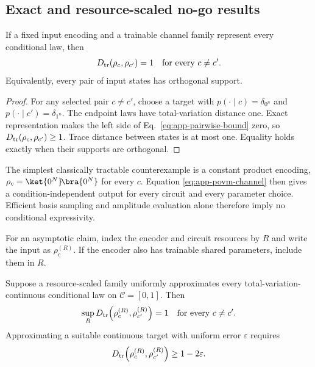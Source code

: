 \subsection{Exact and resource-scaled no-go results}

\begin{corollary}
\label{cor:app-exact-orthogonal}
If a fixed input encoding and a trainable channel family represent every
conditional law, then
\begin{equation}
 D_{\rm tr}(\rho_c,\rho_{c'})=1
 \quad\text{for every }c\neq c'.
 \label{eq:app-exact-orthogonal}
\end{equation}
Equivalently, every pair of input states has orthogonal support.
\end{corollary}

\begin{proof}
For any selected pair $c\neq c'$, choose a target with
$p(\cdot\mid c)=\delta_{0^n}$ and
$p(\cdot\mid c')=\delta_{1^n}$. The endpoint laws have total-variation
distance one. Exact representation makes the left side of
Eq.~\eqref{eq:app-pairwise-bound} zero, so
$D_{\rm tr}(\rho_c,\rho_{c'})\geq1$. Trace distance between states is at most
one. Equality holds exactly when their supports are orthogonal.
\end{proof}

The simplest classically tractable counterexample is a constant product
encoding, $\rho_c=\ket{0^N}\!\bra{0^N}$ for every $c$. Equation
\eqref{eq:app-povm-channel} then gives a condition-independent output for
every circuit and every parameter choice. Efficient basis sampling and
amplitude evaluation alone therefore imply no conditional expressivity.

For an asymptotic claim, index the encoder and circuit resources by $R$ and
write the input as $\rho_c^{(R)}$. If the encoder also has trainable shared
parameters, include them in $R$.

\begin{theorem}
\label{thm:app-asymptotic}
Suppose a resource-scaled family uniformly approximates every
total-variation-continuous conditional law on $\mathcal C=[0,1]$. Then
\begin{equation}
 \sup_R D_{\rm tr}\!\left(
 \rho_c^{(R)},\rho_{c'}^{(R)}\right)=1
 \quad\text{for every }c\neq c'.
 \label{eq:app-asymptotic-separation}
\end{equation}
Approximating a suitable continuous target with uniform error
$\varepsilon$ requires
\begin{equation}
 D_{\rm tr}\!\left(\rho_c^{(R)},\rho_{c'}^{(R)}\right)
 \geq1-2\varepsilon.
 \label{eq:app-epsilon-separation}
\end{equation}
\end{theorem}


